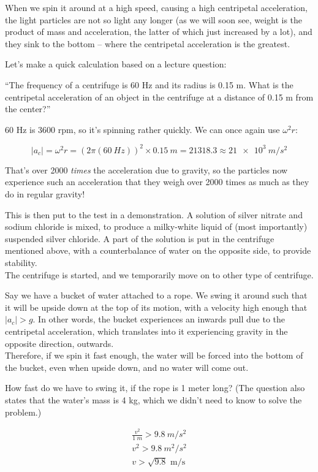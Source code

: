 \documentclass[8.01x]{subfiles}
\begin{document}
When we spin it around at a high speed, causing a high centripetal acceleration, the light particles are not so light any longer (as we will soon see, weight is the product of mass and acceleration, the latter of which just increased by a lot), and they sink to the bottom -- where the centripetal acceleration is the greatest.

Let's make a quick calculation based on a lecture question:

``The frequency of a centrifuge is 60 Hz and its radius is 0.15 m. What is the centripetal acceleration of an object in the centrifuge at a distance of 0.15 m from the center?''

60 Hz is 3600 rpm, so it's spinning rather quickly. We can once again use $\omega^2 r$:

\begin{equation}
|a_c| = \omega^2 r = (2 \pi (\SI{60}{Hz}))^2 \times \SI{0.15}{m} = 21318.3 \approx \SI{21e3}{m/s^2}
\end{equation}

That's over 2000 \emph{times} the acceleration due to gravity, so the particles now experience such an acceleration that they weigh over 2000 times as much as they do in regular gravity!

This is then put to the test in a demonstration. A solution of silver nitrate and sodium chloride is mixed, to produce a milky-white liquid of (most importantly) suspended silver chloride. A part of the solution is put in the centrifuge mentioned above, with a counterbalance of water on the opposite side, to provide stability.\\
The centrifuge is started, and we temporarily move on to other type of centrifuge.

Say we have a bucket of water attached to a rope. We swing it around such that it will be upside down at the top of its motion, with a velocity high enough that $|a_c| > g$. In other words, the bucket experiences an inwards pull due to the centripetal acceleration, which translates into it experiencing gravity in the opposite direction, outwards.\\
Therefore, if we spin it fast enough, the water will be forced into the bottom of the bucket, even when upside down, and no water will come out.

How fast do we have to swing it, if the rope is 1 meter long? (The question also states that the water's mass is 4 kg, which we didn't need to know to solve the problem.)

\begin{align}
\frac{v^2}{\SI{1}{m}} > \SI{9.8}{m/s^2}\\
v^2 > \SI{9.8}{m^2/s^2}\\
v > \sqrt{9.8} \text{ m/s}
\end{align}
\end{document}
